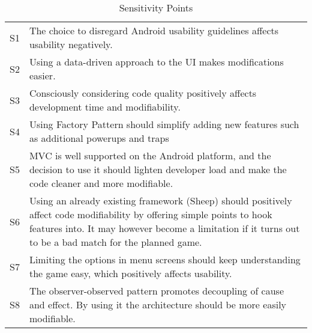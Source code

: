 \begin{table}[H]
	\begin{center}
		\begin{tabular}{| c | p{10cm} | }
    		\hline
			S1 & The choice to disregard Android usability guidelines affects
			     usability negatively.\\
			S2 & Using a data-driven approach to the UI makes modifications
			     easier.\\
			S3 & Consciously considering code quality positively affects
			     development time and modifiability.\\
			S4 & Using Factory Pattern should simplify adding new features
			     such as additional powerups and traps\\															
			S5 & MVC is well supported on the Android platform, and the
			     decision to use it should lighten developer load and
			     make the code cleaner and more modifiable.\\
			S6 & Using an already existing framework (Sheep) should
			     positively affect code modifiability by offering simple
			     points to hook features into.  It may however become a
			     limitation if it turns out to be a bad match for the
			     planned game.\\
		    S7 & Limiting the options in menu screens should keep understanding
		         the game easy, which positively affects usability.\\
		    S8 & The observer-observed pattern promotes decoupling of
		         cause and effect. By using it the architecture should be
		         more easily modifiable.\\
			\hline
    	\end{tabular}
	\end{center}
	\label{tab:sensetivityPoints}
	\caption{Sensitivity Points}
\end{table}
